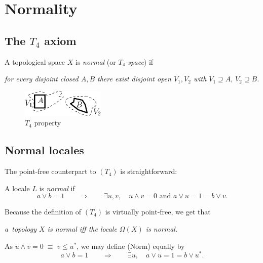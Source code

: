 \chapter{Normality}

\section{The $T_4$ axiom}

\begin{framed}
  \begin{df}[$T_4$]
    A topological space $X$ is \emph{normal\/} (or \emph{$T_4$-space\/}) if
    \begin{center} \it
      for every disjoint closed $A, B$ there exist disjoint open $V_1, V_2$ with
      $V_1\supseteq A, \, V_2\supseteq B$.
    \end{center}
  \end{df}
\end{framed}

\begin{figure}[h]
  \centering
  \includegraphics[height=13mm]{../img/t4.eps}
  \caption{$T_4$ property}
\end{figure}

\section{Normal locales}

The point-free counterpart to $(T_4)$ is straightforward:

\begin{framed}
  \begin{df}[Norm]
    A locale $L$ is \emph{normal\/} if
    \[
      a \vee b = 1 \qquad \Rightarrow \qquad \exists u, v, \quad u \wedge v =
      0 \text{ and } a \vee u = 1 = b \vee v.
    \]
  \end{df}
\end{framed}

Because the definition of $(T_4)$ is virtually point-free, we get that
\begin{center}
  \emph{a~topology $X$ is normal iff the locale $\Omega(X)$ is normal.\/}
\end{center}

\begin{rem}
  As $u \wedge v = 0 \; \equiv \; v \le u^*$, we may define (Norm) equally by
  \[
    a \vee b = 1 \qquad \Rightarrow \qquad \exists u, \quad a \vee u = 1 = b
    \vee u^*.
  \]
\end{rem}

